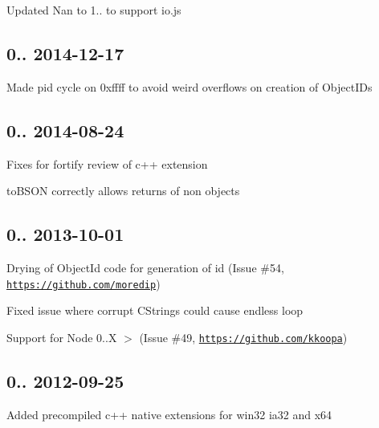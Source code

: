 \begin{DoxyItemize}
\item Updated Nan to 1.. to support io.\+js
\end{DoxyItemize}

\subsection*{0.. 2014-\/12-\/17 }


\begin{DoxyItemize}
\item Made pid cycle on 0xffff to avoid weird overflows on creation of Object\+ID\textquotesingle{}s
\end{DoxyItemize}

\subsection*{0.. 2014-\/08-\/24 }


\begin{DoxyItemize}
\item Fixes for fortify review of c++ extension
\item to\+B\+S\+ON correctly allows returns of non objects
\end{DoxyItemize}

\subsection*{0.. 2013-\/10-\/01 }


\begin{DoxyItemize}
\item Drying of Object\+Id code for generation of id (Issue \#54, \href{https://github.com/moredip}{\tt https\+://github.\+com/moredip})
\item Fixed issue where corrupt C\+String\textquotesingle{}s could cause endless loop
\item Support for Node 0..\+X $>$ (Issue \#49, \href{https://github.com/kkoopa}{\tt https\+://github.\+com/kkoopa})
\end{DoxyItemize}

\subsection*{0.. 2012-\/09-\/25 }


\begin{DoxyItemize}
\item Added precompiled c++ native extensions for win32 ia32 and x64 
\end{DoxyItemize}